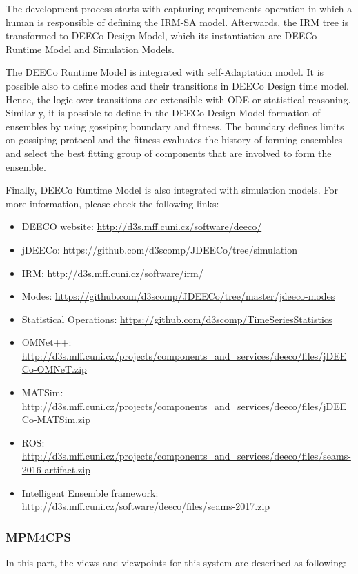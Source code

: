 
The development process starts with capturing requirements operation in which a human is responsible of defining the IRM-SA model. Afterwards, the IRM tree is transformed to DEECo Design Model, which its instantiation are DEECo Runtime Model and Simulation Models. 

The DEECo Runtime Model is integrated with self-Adaptation model. It is possible also to define modes and their transitions in DEECo Design time model. Hence, the logic over transitions are extensible with ODE or statistical reasoning. Similarly, it is possible to define in the DEECo Design Model formation of ensembles by using gossiping boundary and fitness. The boundary defines limits on gossiping protocol and the fitness evaluates the history of forming ensembles and select the best fitting group of components that are involved to form the ensemble.

Finally, DEECo Runtime Model is also integrated with simulation models. For more information, please check the following links:
\begin{itemize}
    \item DEECO website: \url{http://d3s.mff.cuni.cz/software/deeco/}
    \item jDEECo: https://github.com/d3scomp/JDEECo/tree/simulation
    \item IRM: \url{http://d3s.mff.cuni.cz/software/irm/}
    \item Modes: \url{https://github.com/d3scomp/JDEECo/tree/master/jdeeco-modes}
    \item Statistical Operations: \url{https://github.com/d3scomp/TimeSeriesStatistics}
    \item OMNet++: \url{http://d3s.mff.cuni.cz/projects/components_and_services/deeco/files/jDEECo-OMNeT.zip}
    \item MATSim: \url{http://d3s.mff.cuni.cz/projects/components_and_services/deeco/files/jDEECo-MATSim.zip}
    \item ROS: \url{http://d3s.mff.cuni.cz/projects/components_and_services/deeco/files/seams-2016-artifact.zip}
    \item Intelligent Ensemble framework: \url{http://d3s.mff.cuni.cz/software/deeco/files/seams-2017.zip}
\end{itemize}


\subsubsection{MPM4CPS}
In this part, the views and viewpoints for this system are described as following:

